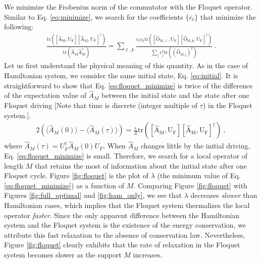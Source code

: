 \documentclass[twocolumn,superscriptaddress, prb]{revtex4-1}
\begin{document}
We minimize the Frobenius norm of the commutator with the Floquet operator.
Similar to Eq. \eqref{eq:minimize}, we search for the coefficients $\{ c_\ell \}$ that minimize the following:
\begin{align}\label{eq:floquet_minimize}
\frac{\mathrm{tr([\hat{A}_M,U_F][\hat{A}_M,U_F]^\dag)}}{\mathrm{tr(\hat{A}_M\hat{A}^\dag_M)}} = \sum_{\ell,k}\frac{c_\ell c_k \mathrm{tr([\hat{O}_{M,\ell},U_F][\hat{O}_{M,k},U_F]^\dag)}}{\sum_j c_j ^2 \mathrm{tr((\hat{O}_{M,j})^2)}} ~.
\end{align}
Let us first understand the physical meaning of this quantity.
As in the case of Hamiltonian system, we consider the same initial state, Eq. \eqref{eq:initial}.
It is straightforward to show that Eq. \eqref{eq:floquet_minimize} is twice of the
difference of the expectation value of $\hat{A}_M$ between the initial state and the state after one Floquet driving
[Note that time is discrete (integer multiple of $\tau$) in the Floquet system.].
\begin{align}
2\left(\langle \hat{A}_M(0) \rangle - \langle \hat{A}_M(\tau) \rangle \right) = \frac{\epsilon}{Z}\mathrm{tr([\hat{A}_M,U_F][\hat{A}_M,U_F]^\dag)} ~,
\end{align}
where $\hat{A}_M(\tau) = U_F^\dag \hat{A}_M(0) U_F$.
When $\hat{A}_M$ changes little by the initial driving, Eq. \eqref{eq:floquet_minimize} is small.
Therefore, we search for a local operator of length $M$ that retains the most of information about the initial state
after one Floquet cycle.
Figure \ref{fig:floquet} is the plot of $\lambda$ (the minimum value of Eq. \ref{eq:floquet_minimize}) as a function of $M$.
Comparing Figure \ref{fig:floquet} with Figures \ref{fig:full_optimal} and \ref{fig:ham_only},
we see that $\lambda$ decreases {\it slower} than Hamiltonian cases, which implies that the Floquet system thermalizes
the local operator {\it faster}. Since the only apparent difference between the Hamiltonian system and the Floquet system
is the existence of the energy conservation, we attribute this fast relaxation to the absence of conservation law.
Nevertheless, Figure \ref{fig:floquet} clearly exhibits that the rate of relaxation in the Floquet system 
becomes slower as the support $M$ increases. 
\end{document}
